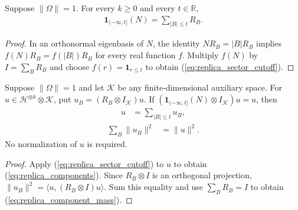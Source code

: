 \begin{theorem}
\label{thm:replica_sector_cutoff}
\leanok
{}
Suppose $\|\Omega\|=1$. For every $k\ge0$ and every $t\in\mathbb R$,
\begin{align}
 \mathbf1_{(-\infty,t]}(N)=\sum_{|B|\le t}R_B.
 \label{eq:replica_sector_cutoff}
\end{align}
\end{theorem}
\begin{proof}
\leanok
{}
In an orthonormal eigenbasis of $N$, the identity $NR_B=|B|R_B$ implies
$f(N)R_B=f(|B|)R_B$ for every real function $f$.
Multiply $f(N)$ by $I=\sum_B R_B$ and choose
$f(r)=\mathbf1_{r\le t}$ to obtain (\ref{eq:replica_sector_cutoff}).
\end{proof}

\begin{theorem}
\label{thm:replica_cutoff_decomposition}
\leanok
{}
Suppose $\|\Omega\|=1$ and let $\mathcal K$ be any finite-dimensional
auxiliary space. For $u\in\mathcal H^{\otimes k}\otimes\mathcal K$, put
$u_B=(R_B\otimes I_{\mathcal K})u$.
If $(\mathbf1_{(-\infty,t]}(N)\otimes I_{\mathcal K})u=u$, then
\begin{align}
 u&=\sum_{|B|\le t}u_B,\label{eq:replica_components}
\end{align}
\begin{align}
 \sum_B\|u_B\|^2&=\|u\|^2.\label{eq:replica_component_mass}
\end{align}
No normalization of $u$ is required.
\end{theorem}
\begin{proof}
\leanok
{}
Apply (\ref{eq:replica_sector_cutoff}) to $u$ to obtain
(\ref{eq:replica_components}). Since $R_B\otimes I$ is an orthogonal
projection, $\|u_B\|^2=\langle u,(R_B\otimes I)u\rangle$.
Sum this equality and use $\sum_B R_B=I$ to obtain
(\ref{eq:replica_component_mass}).
\end{proof}
